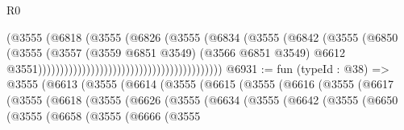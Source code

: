 \begin{lexlean}{R0}
\begin{coremodule}
                                                                (@3555
                                                                  (@6818
                                                                    (@3555
                                                                      (@6826
                                                                        (@3555
                                                                          (@6834
                                                                            (@3555
                                                                              (@6842
                                                                                (@3555
                                                                                  (@6850
                                                                                    (@3555
                                                                                      (@3557
                                                                                        (@3559
                                                                                          @6851
                                                                                          @3549)
                                                                                        (@3566
                                                                                          @6851
                                                                                          @3549)
                                                                                        @6612
                                                                                        @3551))))))))))))))))))))))))))))))))))))))))))
@6931 := fun (typeId : @38) =>
  @3555
    (@6613
      (@3555
        (@6614
          (@3555
            (@6615
              (@3555
                (@6616
                  (@3555
                    (@6617
                      (@3555
                        (@6618
                          (@3555
                            (@6626
                              (@3555
                                (@6634
                                  (@3555
                                    (@6642
                                      (@3555
                                        (@6650
                                          (@3555
                                            (@6658
                                              (@3555
                                                (@6666
                                                  (@3555

\end{coremodule}
\end{lexlean}
